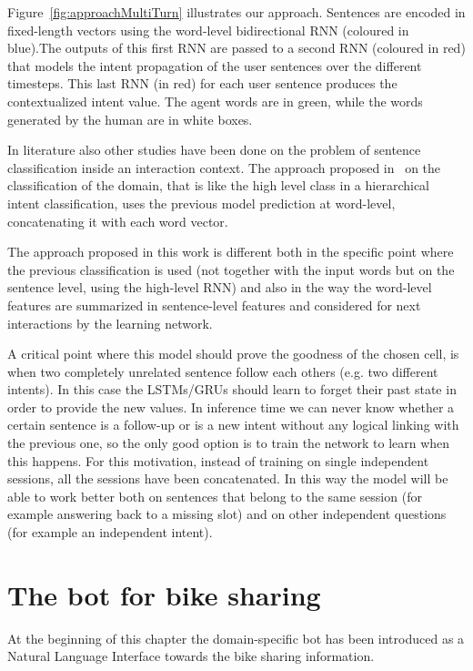 Figure~\ref{fig:approachMultiTurn} illustrates our approach. Sentences are encoded in fixed-length vectors using the word-level bidirectional RNN (coloured in blue).The outputs of this first RNN are passed to a second RNN (coloured in red) that models the intent propagation of the user sentences over the different timesteps. This last RNN (in red) for each user sentence produces the contextualized intent value. The agent words are in green, while the words generated by the human are in white boxes.

In literature also other studies have been done on the problem of sentence classification inside an interaction context. The approach proposed in~\cite{xu2014contextual} on the classification of the domain, that is like the high level class in a hierarchical intent classification, uses the previous model prediction at word-level, concatenating it with each word vector.

The approach proposed in this work is different both in the specific point where the previous classification is used (not together with the input words but on the sentence level, using the high-level RNN) and also in the way the word-level features are summarized in sentence-level features and considered for next interactions by the learning network.

A critical point where this model should prove the goodness of the chosen cell, is when two completely unrelated sentence follow each others (e.g. two different intents). In this case the LSTMs/GRUs should learn to forget their past state in order to provide the new values. In inference time we can never know whether a certain sentence is a follow-up or is a new intent without any logical linking with the previous one, so the only good option is to train the network to learn when this happens. For this motivation, instead of training on single independent sessions, all the sessions have been concatenated. In this way the model will be able to work better both on sentences that belong to the same session (for example answering back to a missing slot) and on other independent questions (for example an independent intent).

\section{The bot for bike sharing}
\label{approachPrototype}

At the beginning of this chapter the domain-specific bot has been introduced as a Natural Language Interface towards the bike sharing information.

